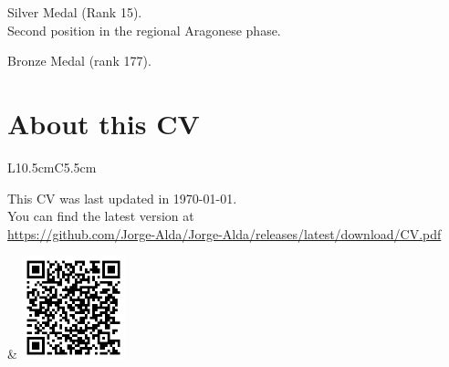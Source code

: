 \documentclass{cvf}
\begin{document}
Silver Medal (Rank 15).\\
Second position in the regional Aragonese phase.

Bronze Medal (rank 177).

\newpage

\section{About this CV}
\begin{tabular}{L{10.5cm}C{5.5cm}}
\begin{minipage}[b]{10cm}
This CV was last updated in \today.\\
You can find the latest version at \\ \url{https://github.com/Jorge-Alda/Jorge-Alda/releases/latest/download/CV.pdf}
\end{minipage} & \includegraphics[width=3cm]{qrcode.png}
\end{tabular}
\end{document}
